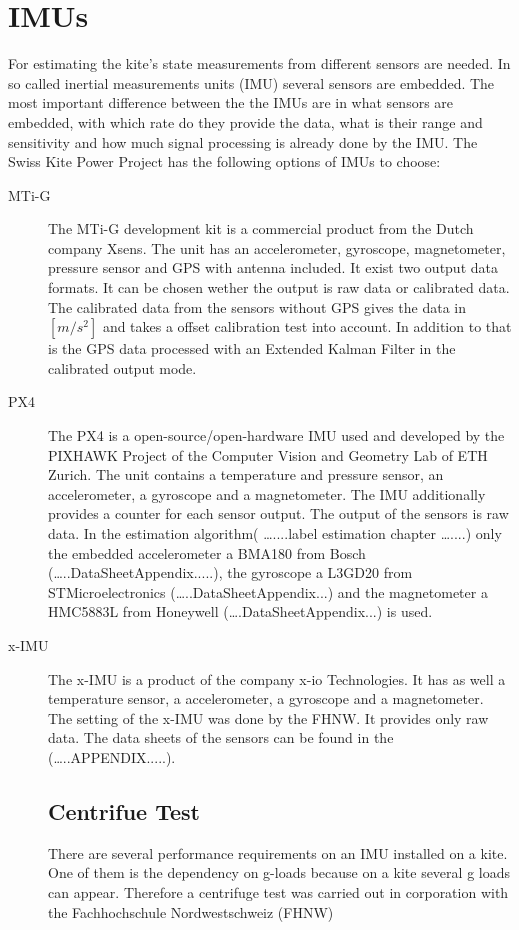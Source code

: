 \chapter{IMUs}\label{cha2}

For estimating the kite's state measurements from different sensors are needed. In so called inertial measurements units (IMU)  several sensors are embedded. The most important difference between the the IMUs are in what sensors are embedded, with which rate do they provide the data, what is their range and sensitivity and how much signal processing is already done by the IMU.
The Swiss Kite Power Project has the following options of IMUs to choose:

\begin{description}
\item[MTi-G]
The MTi-G development kit is a commercial product from the Dutch company Xsens. The unit has an accelerometer, gyroscope, magnetometer, pressure sensor and GPS with antenna included. It exist two output data formats. It can be chosen wether the output is raw data or calibrated data. The calibrated data from the sensors without GPS gives the data in $[m/s^2]$ and takes a offset calibration test into account. In addition to that is the GPS data processed with an Extended  Kalman Filter in the calibrated output mode.

\item[PX4]
The PX4 is a open-source/open-hardware IMU used and developed by the PIXHAWK Project of the Computer Vision and Geometry Lab of ETH Zurich. The unit contains a temperature and pressure sensor, an accelerometer, a gyroscope and a magnetometer. The IMU additionally provides a counter for each sensor output. The output of the sensors is raw data. In the estimation algorithm( …....label estimation chapter …....) only the embedded accelerometer a BMA180 from Bosch (…..DataSheetAppendix.....), the gyroscope a L3GD20 from STMicroelectronics (…..DataSheetAppendix...) and the magnetometer a HMC5883L from Honeywell (….DataSheetAppendix...) is used.

\item[x-IMU]
The x-IMU is a product of the company x-io Technologies. It has as well a temperature sensor, a accelerometer, a gyroscope and a magnetometer. The setting of the x-IMU was done by the FHNW. It provides only raw data. The data sheets of the sensors can be found in the (…..APPENDIX.....).
\section{Centrifue Test}
There are several performance requirements on an IMU installed on a kite. One of them is the dependency on g-loads because on a kite several g loads can appear. Therefore a centrifuge test was carried out in corporation with the Fachhochschule Nordwestschweiz (FHNW)

\end{description}

